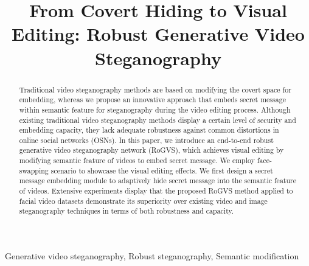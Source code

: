 \documentclass{article}
\begin{document}
\sloppy

\def\x{{\mathbf x}}
\def\L{{\cal L}}


%
\title{From Covert Hiding to Visual Editing: Robust Generative Video Steganography}
\address{School of Computer Science, Fudan University, China\\
\{xymao22@m., xxhu23@m., pengwanli, zlgan23@m., qcying20@, zxqian@, lisheng@, zhangxinpeng@\}\\fudan.edu.cn
}


\maketitle


%
\begin{abstract}
Traditional video steganography methods are based on modifying the covert space for embedding, whereas we propose an innovative approach that embeds secret message within semantic feature for steganography during the video editing process.
Although existing traditional video steganography methods display a certain level of security and embedding capacity, they lack adequate robustness  against common distortions in online social networks (OSNs).
In this paper, we introduce an end-to-end robust generative video steganography network (RoGVS), which achieves visual editing by modifying semantic feature of videos to embed secret message. We employ face-swapping scenario to showcase the visual editing effects. We first design a secret message embedding module to adaptively hide secret message into the semantic feature of videos.
Extensive experiments display that the proposed RoGVS method applied to facial video datasets demonstrate its superiority over existing video and image steganography techniques in terms of both robustness and capacity.




\end{abstract}
%
\begin{keywords}
Generative video steganography, Robust steganography, Semantic modification
\end{keywords}
%
\end{document}
